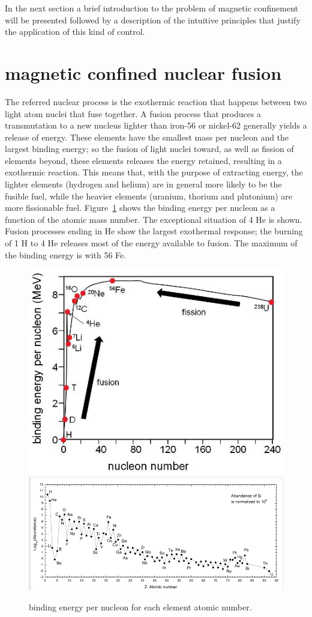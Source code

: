 In the next section a brief introduction to the problem of magnetic confinement will be presented followed by a description of the intuitive principles that justify the application of this kind of control.




\section{magnetic confined nuclear fusion}
The referred nuclear process is the exothermic reaction that happens between two light atom nuclei that fuse together. A fusion process that produces a transmutation to a new nucleus lighter than iron-56 or nickel-62 generally yields a release of energy. These elements have the smallest mass per nucleon and the largest binding energy; so the fusion of light nuclei toward, as well as fission of elements beyond, these elements releases the energy retained, resulting in a exothermic reaction.  This means that, with the purpose of extracting energy, the lighter elements (hydrogen and helium) are in general more likely to be the fusible fuel, while the heavier elements (uranium, thorium and plutonium) are more fissionable fuel. 
Figure~\ref{fig:binding} shows the binding energy per nucleon as a function of the atomic mass number. The exceptional situation of 4 He is shown. Fusion processes ending in He show the largest exothermal response; the burning of 1 H to 4 He releases most of the energy available to fusion. The maximum of the binding energy is with 56 Fe.

\begin{figure}[ht!]
\includegraphics[height=0.25\textwidth]{img/binding_energy.jpg} \centering
\includegraphics[height=0.25\textwidth]{img/abundance.png} \centering
\caption{binding energy per nucleon for each element atomic number. }
\label{fig:binding}
\end{figure}

